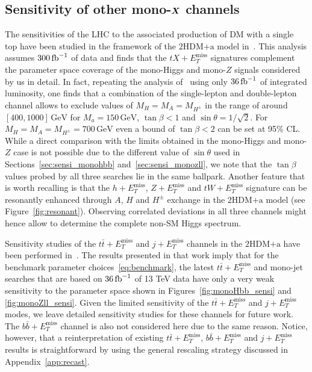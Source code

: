 \documentclass[review]{elsarticle}
\newcommand{\MET}{\ensuremath{E_T^\mathrm{miss}}\xspace}
\newcommand{\ma}{\ensuremath{M_{a}}\xspace}
\newcommand{\mHc}{\ensuremath{M_{H^{\pm}}}\xspace}
\newcommand{\hdma}{\ensuremath{\textrm{2HDM+a}}\xspace}
\def\bm#1{\mbox{\boldmath$#1$\unboldmath}}
\begin{document}
\subsection[Sensitivity of other mono-$X$ channels]{Sensitivity of other mono-$\bm{X}$ channels}
\label{sec:sensi_others}

The sensitivities of the LHC to the associated production of DM with a single top have been  studied in the framework of the \hdma model in~\cite{Pani:2017qyd}. This analysis assumes $300 \, {\rm fb}^{-1}$ of data and finds that the $t X + \MET$ signatures complement the parameter space coverage of the mono-Higgs and  mono-$Z$ signals considered by us in detail.   In fact, repeating  the analysis of~\cite{Pani:2017qyd} using only   $36 \, {\rm fb}^{-1}$ of integrated luminosity, one finds that a combination of the single-lepton and double-lepton channel allows to exclude values of $M_H = M_A = \mHc$ in the range of around $[400, 1000 ] \, {\mathrm{GeV}}$ for $\ma = 150 \, {\mathrm{GeV}}$, $\tan \beta < 1$ and $\sin \theta = 1/\sqrt{2}$. For $M_H = M_A = \mHc = 700 \, {\mathrm{GeV}}$ even a bound of $\tan \beta < 2$ can be set at 95\% CL. While a direct comparison with the limits obtained in the mono-Higgs and mono-$Z$ case is not possible due to the different value of $\sin \theta$ used in Sections~\ref{sec:sensi_monohbb} and~\ref{sec:sensi_monozll},  we note that the $\tan \beta$ values probed by all three searches  lie in the same ballpark. Another feature that is worth recalling is that the $h+\MET$, $Z+\MET$ and $tW+\MET$ signature can be resonantly enhanced through $A$, $H$ and $H^\pm$ exchange in the \hdma model (see Figure~\ref{fig:resonant}). Observing correlated deviations in all three channels might hence allow to determine the complete non-SM Higgs spectrum. 

Sensitivity studies of the $t \bar t + \MET$ and $j + \MET$ channels in the \hdma have been performed in~\cite{Bauer:2017ota}. The results presented in that work imply that for the benchmark parameter choices~\eqref{eq:benchmark}, the latest  $t \bar t + \MET$ and  mono-jet searches that are based on $36 \, {\rm fb}^{-1}$ of 13 TeV data have  only a very weak sensitivity to the parameter space shown in Figures~\ref{fig:monoHbb_sensi} and \ref{fig:monoZll_sensi}. Given the limited sensitivity of the $t \bar t + \MET$ and $j + \MET$  modes, we leave detailed sensitivity studies for these channels for future work. The $b \bar b + \MET$ channel is also not considered here due to the same reason. Notice, however, that a reinterpretation of existing $t \bar t + \MET$, $b \bar b + \MET$ and $j + \MET$ results is straightforward by using the general rescaling strategy discussed in Appendix~\ref{app:recast}. 
\end{document}
